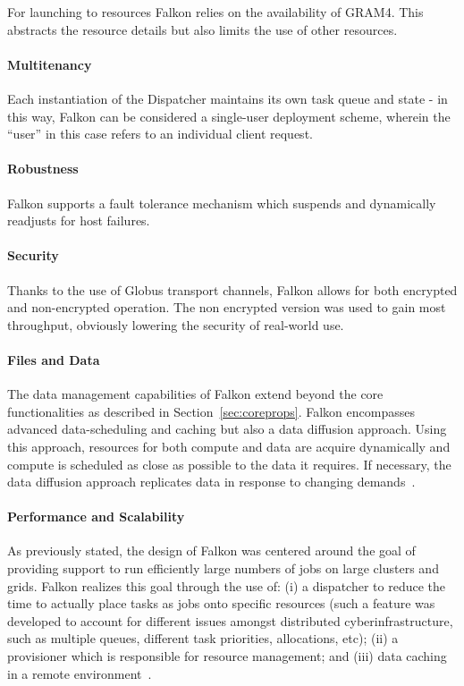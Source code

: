 \documentclass{sig-alternate}
\begin{document}
For launching to resources Falkon relies on the availability of GRAM4.
This abstracts the resource details but also limits the use of other resources.

\paragraph{Multitenancy}

Each instantiation of the Dispatcher maintains its own task queue and state -
in this way, Falkon can be considered a single-user deployment scheme, wherein
the ``user'' in this case refers to an individual client request.

\paragraph{Robustness}

Falkon supports a fault tolerance mechanism which suspends and dynamically
readjusts for host failures.

\paragraph{Security}

Thanks to the use of Globus transport channels, Falkon allows for both
encrypted and non-encrypted operation. The non encrypted version was used to
gain most throughput, obviously lowering the security of real-world use.

\paragraph{Files and Data}

The data management capabilities of Falkon extend beyond the core
\pilotjob functionalities as described in Section~\ref{sec:coreprops}. Falkon
encompasses advanced data-scheduling and caching but also a data diffusion
approach. Using this approach, resources for both compute and data are acquire
dynamically and compute is scheduled as close as possible to the data it
requires. If necessary, the data diffusion approach replicates data in response
to changing demands~\cite{raicu2008accelerating}.

\paragraph{Performance and Scalability}

As previously stated, the design of Falkon was centered around the goal of
providing support to run efficiently large numbers of jobs  on large clusters
and grids. Falkon realizes this goal through the use of: (i) a dispatcher to
reduce the time to actually place tasks as jobs onto specific resources (such a
feature was developed to account for different issues amongst distributed
cyberinfrastructure, such as multiple queues, different task priorities,
allocations, etc); (ii) a provisioner which is responsible for resource
management; and (iii) data caching in a remote environment~\cite{1362680}.
\end{document}
